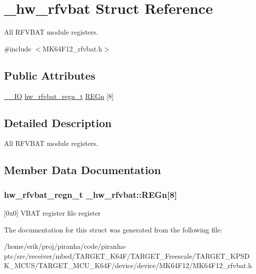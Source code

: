 \hypertarget{struct__hw__rfvbat}{}\section{\+\_\+hw\+\_\+rfvbat Struct Reference}
\label{struct__hw__rfvbat}


All R\+F\+V\+B\+AT module registers.  




{\ttfamily \#include $<$M\+K64\+F12\+\_\+rfvbat.\+h$>$}

\subsection*{Public Attributes}
\begin{DoxyCompactItemize}
\item 
\hyperlink{core__sc300_8h_aec43007d9998a0a0e01faede4133d6be}{\+\_\+\+\_\+\+IO} \hyperlink{union__hw__rfvbat__regn}{hw\+\_\+rfvbat\+\_\+regn\+\_\+t} \hyperlink{struct__hw__rfvbat_a6a5acf4020091cdf16485a1bcd20ca51}{R\+E\+Gn} \mbox{[}8\mbox{]}
\end{DoxyCompactItemize}


\subsection{Detailed Description}
All R\+F\+V\+B\+AT module registers. 

\subsection{Member Data Documentation}
\subsubsection[{\texorpdfstring{R\+E\+Gn}{REGn}}]{ {\bf hw\+\_\+rfvbat\+\_\+regn\+\_\+t} \+\_\+hw\+\_\+rfvbat\+::\+R\+E\+Gn\mbox{[}8\mbox{]}}\hypertarget{struct__hw__rfvbat_a6a5acf4020091cdf16485a1bcd20ca51}{}\label{struct__hw__rfvbat_a6a5acf4020091cdf16485a1bcd20ca51}
\mbox{[}0x0\mbox{]} V\+B\+AT register file register 

The documentation for this struct was generated from the following file\+:\begin{DoxyCompactItemize}
\item 
/home/erik/proj/piranha/code/piranha-\/ptc/src/receiver/mbed/\+T\+A\+R\+G\+E\+T\+\_\+\+K64\+F/\+T\+A\+R\+G\+E\+T\+\_\+\+Freescale/\+T\+A\+R\+G\+E\+T\+\_\+\+K\+P\+S\+D\+K\+\_\+\+M\+C\+U\+S/\+T\+A\+R\+G\+E\+T\+\_\+\+M\+C\+U\+\_\+\+K64\+F/device/device/\+M\+K64\+F12/M\+K64\+F12\+\_\+rfvbat.\+h\end{DoxyCompactItemize}
